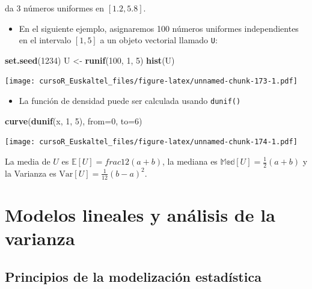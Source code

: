 \documentclass[]{book}
\newenvironment{Shaded}{\begin{snugshade}}{\end{snugshade}}
\newcommand{\KeywordTok}[1]{\textcolor[rgb]{0.13,0.29,0.53}{\textbf{#1}}}
\newcommand{\DataTypeTok}[1]{\textcolor[rgb]{0.13,0.29,0.53}{#1}}
\newcommand{\DecValTok}[1]{\textcolor[rgb]{0.00,0.00,0.81}{#1}}
\newcommand{\StringTok}[1]{\textcolor[rgb]{0.31,0.60,0.02}{#1}}
\newcommand{\NormalTok}[1]{#1}
\providecommand{\tightlist}{%
  \setlength{\itemsep}{0pt}\setlength{\parskip}{0pt}}
\begin{document}
da 3 números uniformes en \([1.2,5.8]\).

\begin{itemize}
\tightlist
\item
  En el siguiente ejemplo, asignaremos 100 números uniformes
  independientes en el intervalo \([1,5]\) a un objeto vectorial llamado
  \texttt{U}:
\end{itemize}

\begin{Shaded}
\begin{Highlighting}[]
\KeywordTok{set.seed}\NormalTok{(}\DecValTok{1234}\NormalTok{)}
\NormalTok{U <-}\StringTok{ }\KeywordTok{runif}\NormalTok{(}\DecValTok{100}\NormalTok{, }\DecValTok{1}\NormalTok{, }\DecValTok{5}\NormalTok{)}
\KeywordTok{hist}\NormalTok{(U)}
\end{Highlighting}
\end{Shaded}

\texttt{[image: cursoR\_Euskaltel\_files/figure-latex/unnamed-chunk-173-1.pdf]}

\begin{itemize}
\tightlist
\item
  La función de densidad puede ser calculada usando \texttt{dunif()}
\end{itemize}

\begin{Shaded}
\begin{Highlighting}[]
\KeywordTok{curve}\NormalTok{(}\KeywordTok{dunif}\NormalTok{(x, }\DecValTok{1}\NormalTok{, }\DecValTok{5}\NormalTok{), }\DataTypeTok{from=}\DecValTok{0}\NormalTok{, }\DataTypeTok{to=}\DecValTok{6}\NormalTok{)}
\end{Highlighting}
\end{Shaded}

\texttt{[image: cursoR\_Euskaltel\_files/figure-latex/unnamed-chunk-174-1.pdf]}

La media de \(U\) es \(\mathbb{E}[U]=frac{1}{2}(a+b)\), la mediana es
\(\mathbb{Med}[U]=\frac{1}{2}(a+b)\) y la Varianza es
\(\mbox{Var}[U]=\frac{1}{12}(b-a)^2\).

\chapter{Modelos lineales y análisis de la
varianza}\label{modelos-lineales-y-analisis-de-la-varianza}

\section{Principios de la modelización
estadística}\label{principios-de-la-modelizacion-estadistica}
\end{document}
